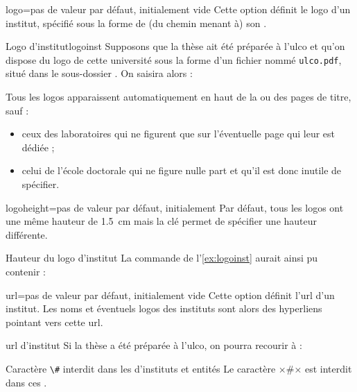 \begin{docKey}{logo}{=}{pas de valeur
    par défaut, initialement vide}
  Cette option définit le logo d'un institut, spécifié sous la forme de (du
  chemin menant à) son .
  \begin{dbexample}{Logo d'institut}{logoinst}
    Supposons que la thèse ait été préparée à l'\gls{ulco} et qu'on dispose du
    logo de cette université sous la forme d'un fichier nommé
    \texttt{ulco.pdf}, situé dans le sous-dossier . On
    saisira alors :
\begin{bodycode}
\end{bodycode}
\end{dbexample}
Tous les logos apparaissent automatiquement en haut de la ou des
pages de titre, sauf :
\begin{itemize}
\item ceux des laboratoires qui ne figurent que sur l'éventuelle page qui leur
  est dédiée ;
\item celui de l'école doctorale qui ne figure nulle part et qu'il est donc
  inutile de spécifier.
\end{itemize}
\end{docKey}
%
\begin{docKey}{logoheight}{=}{pas de valeur par
    défaut, initialement \docValue*{1.5cm}}
  Par défaut, tous les logos ont une même hauteur de \SI{1.5}{\cm}
  mais la clé  permet de spécifier une hauteur
  différente.
  \begin{dbexample}{Hauteur du logo d'institut}{}
    La commande de l'\vref{ex:logoinst} aurait ainsi pu contenir :
\begin{bodycode}
\end{bodycode}
\end{dbexample}
\end{docKey}
%
%
\begin{docKey}{url}{=}{pas de valeur par
    défaut, initialement vide}
  Cette option définit l'\acrshort{url} d'un institut. Les noms et
  éventuels logos des instituts sont alors des hyperliens pointant
  vers cette \acrshort{url}.
  \begin{dbexample}{\acrshort*{url} d'institut}{}
    Si la thèse a été préparée à l'\gls{ulco}, on pourra recourir à
    : \NoAutoSpacing%
\begin{bodycode}
\end{bodycode}
\end{dbexample}
\begin{dbwarning}{Caractère \protect\lstinline+\#+ interdit dans les
     d'instituts et entités}{}
  Le caractère ×#× est interdit dans ces .
\end{dbwarning}
\end{docKey}

